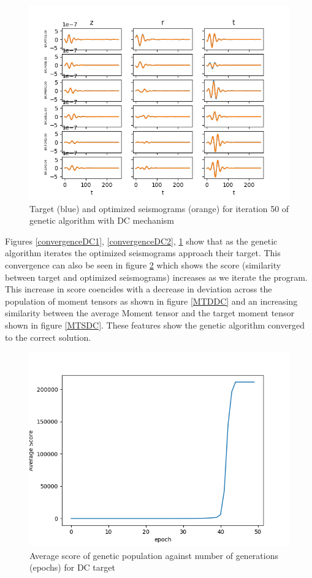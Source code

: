 \documentclass{article}
\begin{document}
\begin{figure}[H]
	\centering
	\includegraphics{dataSet1/plots/optimized49.png}
	\caption{Target (blue) and optimized seismograms (orange) for iteration 50 of genetic algorithm with DC mechanism}
	\label{convergenceDC3}
\end{figure}

Figures \ref{convergenceDC1}, \ref{convergenceDC2}, \ref{convergenceDC3} show that as the genetic algorithm iterates the optimized seismograms 
approach their target. This convergence can also be seen in figure \ref{scoresDC} which shows the score (similarity between target and optimized seismograms) increases as we iterate the program. This increase in score coencides with a decrease in deviation across the population of moment tensors as shown in figure \ref{MTDDC} and an increasing similarity between the average Moment tensor and the target moment tensor shown in figure \ref{MTSDC}. These features show the genetic algorithm converged to the correct solution. 
\begin{figure}[H]
	\centering
	\includegraphics{dataSet1/scores.png}
	\caption{Average score of genetic population against number of generations (epochs) for DC target}
	\label{scoresDC}
\end{figure}
\end{document}
